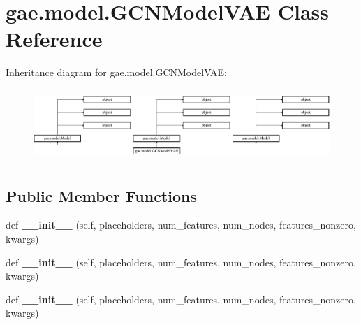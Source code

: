 \hypertarget{classgae_1_1model_1_1GCNModelVAE}{}\section{gae.\+model.\+G\+C\+N\+Model\+V\+AE Class Reference}
\label{classgae_1_1model_1_1GCNModelVAE}
Inheritance diagram for gae.\+model.\+G\+C\+N\+Model\+V\+AE\+:\begin{figure}[H]
\begin{center}
\leavevmode
\includegraphics[height=2.745098cm]{classgae_1_1model_1_1GCNModelVAE}
\end{center}
\end{figure}
\subsection*{Public Member Functions}
\begin{DoxyCompactItemize}
\item 
\mbox{\label{classgae_1_1model_1_1GCNModelVAE_a80b3e5bbe7e8e39ddd7b2f02942f148f}} 
def {\bfseries \+\_\+\+\_\+init\+\_\+\+\_\+} (self, placeholders, num\+\_\+features, num\+\_\+nodes, features\+\_\+nonzero, kwargs)
\item 
\mbox{\label{classgae_1_1model_1_1GCNModelVAE_a80b3e5bbe7e8e39ddd7b2f02942f148f}} 
def {\bfseries \+\_\+\+\_\+init\+\_\+\+\_\+} (self, placeholders, num\+\_\+features, num\+\_\+nodes, features\+\_\+nonzero, kwargs)
\item 
\mbox{\label{classgae_1_1model_1_1GCNModelVAE_a80b3e5bbe7e8e39ddd7b2f02942f148f}} 
def {\bfseries \+\_\+\+\_\+init\+\_\+\+\_\+} (self, placeholders, num\+\_\+features, num\+\_\+nodes, features\+\_\+nonzero, kwargs)
\end{DoxyCompactItemize}
